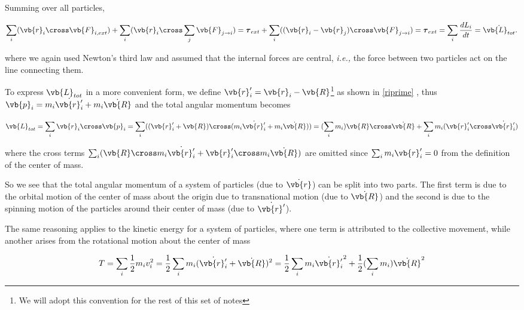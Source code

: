 \documentclass[a4paper,12pt]{report}
\begin{document}
Summing over all particles, 

\begin{equation}
	\sum_{i}^{} (\vb{r} _{i} \cross \vb{F} _{i,ext}) + \sum_{i}^{} (\vb{r} _{i} \cross \sum_{j}^{} \vb{F} _{j \rightarrow i}) = \boldsymbol{\tau }_{ext}  + \sum_{i}^{} ((\vb{r} _{i} - \vb{r} _{j} ) \cross  \vb{F} _{j \rightarrow  i } ) = \boldsymbol{\tau } _{ext} = \sum_{i}^{} \frac{dL_{i} }{dt}  = \dot{\vb{L}_{tot}}. 
\end{equation}

where we again used Newton's third law and assumed that the internal forces are central, \textit{i.e.,} the force between two particles act on the line connecting them.

To express \(\vb{L} _{tot} \) in a more convenient form, we define \(\vb{r}'_{i} = \vb{r} _{i} - \vb{R}  \)\footnote{We will adopt this convention for the rest of this set of notes}  as shown in \cref{riprime}  , thus \(\vb{p} _{i} = m_{i}\dot{\vb{r} '_{i} }  + m_{i} \dot{\vb{R} }  \) and the total angular momentum becomes 

\begin{equation}
	\vb{L} _{tot} = \sum_{i}^{} \vb{r} _{i} \cross \vb{p} _{i} = \sum_{i}^{}  ((\vb{r} '_{i} + \vb{R} ) \cross (m_{i}\dot{\vb{r} '_{i} }  + m_{i} \dot{\vb{R} } )) = (\sum_{i}^{} m_{i}) \vb{R} \cross \dot{\vb{R} } + \sum_{i}^{} m_{i} (\vb{r} '_{i} \cross \dot{\vb{r} '_{i} } )  \label{L1}   
\end{equation}

where the cross terms \(\sum_{i}^{} (\vb{R} \cross m_{i} \dot{\vb{r} '_{i} }  + \vb{r} '_{i} \cross m_{i}  \dot{\vb{R} } ) \) are omitted since \(\sum_{i}^{} m_{i} \vb{r} '_{i} = 0 \) from the definition of the center of mass.

So we see that the total angular momentum of a system of particles (due to \(\dot{\vb{r} } \))  can be split into two parts. The first term is due to the orbital motion of the center of mass about the origin due to transnational motion (due to \(\dot{\vb{R} } \))  and the second is due to the spinning motion of the particles around their center of mass (due to \(\dot{\vb{r} '} \)).

The same reasoning applies to the kinetic energy for a system of particles, where one term is attributed to the collective movement, while another arises from the rotational motion about the center of mass

\begin{equation}
	T = \sum_{i}^{} \frac{1}{2} m_{i} v_{i} ^2 = \frac{1}{2}  \sum_{i}^{}  m_{i} (\dot{\vb{r} '_{i} } + \dot{\vb{R} } )^2 = \frac{1}{2} \sum_{i}^{} m_{i} \dot{\vb{r} '_{i} } ^2 + \frac{1}{2} (\sum_{i}^{} m_{i} ) \dot{\vb{R} } ^2  \label{T1}   
\end{equation}
\end{document}
